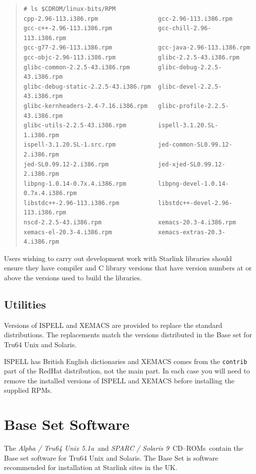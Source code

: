 \documentclass[twoside,11pt]{article}
\newcommand{\xlabel}[1]{}
\renewcommand{\_}{\texttt{\symbol{95}}}
\newcommand{\cdroms}{CD--ROMs}
\newcommand{\cdroms}{CD-ROMs}
\newcommand{\axp}{\textit{Alpha / Tru64 Unix 5.1a}}
\newcommand{\sol}{\textit{SPARC / Solaris 9}}
\begin{document}
\begin{quote}
\begin{verbatim}
# ls $CDROM/linux-bits/RPM
cpp-2.96-113.i386.rpm                 gcc-2.96-113.i386.rpm
gcc-c++-2.96-113.i386.rpm             gcc-chill-2.96-113.i386.rpm
gcc-g77-2.96-113.i386.rpm             gcc-java-2.96-113.i386.rpm
gcc-objc-2.96-113.i386.rpm            glibc-2.2.5-43.i386.rpm
glibc-common-2.2.5-43.i386.rpm        glibc-debug-2.2.5-43.i386.rpm
glibc-debug-static-2.2.5-43.i386.rpm  glibc-devel-2.2.5-43.i386.rpm
glibc-kernheaders-2.4-7.16.i386.rpm   glibc-profile-2.2.5-43.i386.rpm
glibc-utils-2.2.5-43.i386.rpm         ispell-3.1.20.SL-1.i386.rpm
ispell-3.1.20.SL-1.src.rpm            jed-common-SL0.99.12-2.i386.rpm
jed-SL0.99.12-2.i386.rpm              jed-xjed-SL0.99.12-2.i386.rpm
libpng-1.0.14-0.7x.4.i386.rpm         libpng-devel-1.0.14-0.7x.4.i386.rpm
libstdc++-2.96-113.i386.rpm           libstdc++-devel-2.96-113.i386.rpm
nscd-2.2.5-43.i386.rpm                xemacs-20.3-4.i386.rpm
xemacs-el-20.3-4.i386.rpm             xemacs-extras-20.3-4.i386.rpm
\end{verbatim}
\end{quote}

Users wishing to carry out development work with Starlink libraries should
ensure they have compiler and C library versions that have version numbers at
or above the versions used to build the libraries.

\subsection{\xlabel{utilities}Utilities}
\label{utilities}

Versions of ISPELL and XEMACS are provided to replace the standard
distributions.  The replacements match the versions distributed
in the Base set for Tru64 Unix and Solaris.

ISPELL has British English dictionaries and XEMACS comes from the
\texttt{contrib} part of the RedHat distribution, not the main part.
In each case you will need to remove the installed versions of ISPELL
and XEMACS before installing the supplied RPMs.

\section{\xlabel{base_set_software}Base Set Software}
\label{base_set_software}

The \axp\ and \sol\  \cdroms\ contain the Base set software for Tru64 Unix
and Solaris.  The Base Set is software recommended for installation at
Starlink sites in the UK\@.
\end{document}
